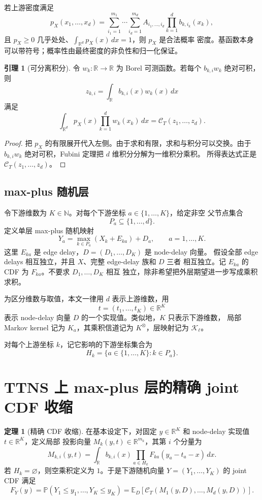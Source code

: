 \documentclass[a4paper,11pt]{article}
\theoremstyle{definition}
\newtheorem{theorem}{定理}
\newtheorem{lemma}{引理}
\newcommand{\R}{\mathbb R}
\newcommand{\N}{\mathbb N}
\newcommand{\E}{\mathbb E}
\newcommand{\Prob}{\mathbb P}
\newcommand{\1}{\mathbf 1}
\newcommand{\Kprod}{K^{\otimes}}
\begin{document}
若上游密度满足
\[
p_X(x_1,\ldots,x_d)
=
\sum_{i_1=1}^{m_1}\cdots\sum_{i_d=1}^{m_d}
A_{i_1,\ldots,i_d}
\prod_{k=1}^{d}b_{k,i_k}(x_k),
\]
且 $p_X\ge 0$ 几乎处处、$\int_{\R^d}p_X(x)\,dx=1$，则 $p_X$ 是合法概率
密度。基函数本身可以带符号；概率性由最终密度的非负性和归一化保证。

\begin{lemma}[可分离积分]
令 $w_k:\R\to\R$ 为 Borel 可测函数。若每个 $b_{k,i}w_k$ 绝对可积，则
\[
z_{k,i}=\int_\R b_{k,i}(x)w_k(x)\,dx
\]
满足
\[
\int_{\R^d}p_X(x)\prod_{k=1}^{d}w_k(x_k)\,dx
=
\mathcal C_T(z_1,\ldots,z_d).
\]
\end{lemma}

\begin{proof}
把 $p_X$ 的有限展开代入左侧。由于求和有限，求和与积分可以交换。由于
$b_{k,i}w_k$ 绝对可积，Fubini 定理把 $d$ 维积分分解为一维积分乘积。
所得表达式正是 $\mathcal C_T(z_1,\ldots,z_d)$。
\end{proof}

\subsection{max-plus 随机层}

令下游维数为 $K\in\N$。对每个下游坐标 $a\in\{1,\ldots,K\}$，给定非空
父节点集合
\[
P_a\subseteq\{1,\ldots,d\}.
\]
定义单层 max-plus 随机映射
\begin{equation}
\label{eq:maxplus}
Y_a=\max_{k\in P_a}(X_k+E_{ka})+D_a,
\qquad a=1,\ldots,K.
\end{equation}
这里 $E_{ka}$ 是 edge delay，$D=(D_1,\ldots,D_K)$ 是 node-delay 向量。
假设全部 edge delays 相互独立，并且 $X$、完整 edge-delay 族和 $D$ 三者
相互独立。记 $E_{ka}$ 的 CDF 为 $F_{ka}$。不要求 $D_1,\ldots,D_K$ 相互
独立，除非希望把外层期望进一步写成乘积求积。

为区分维数与取值，本文一律用 $d$ 表示上游维数，用
\[
t=(t_1,\ldots,t_K)\in\R^K
\]
表示 node-delay 向量 $D$ 的一个实现值。类似地，$K$ 只表示下游维数，
局部 Markov kernel 记为 $K_a$，其乘积信道记为 $\Kprod$，层映射记为
$\mathcal K_\ell$。

对每个上游坐标 $k$，记它影响的下游坐标集合为
\[
H_k=\{a\in\{1,\ldots,K\}:k\in P_a\}.
\]

\section{TTNS 上 max-plus 层的精确 joint CDF 收缩}
\label{sec:exact}

\begin{theorem}[精确 CDF 收缩]
\label{thm:exact}
在基本设定下，对固定 $y\in\R^K$ 和 node-delay 实现值 $t\in\R^K$，定义局部
投影向量 $M_k(y,t)\in\R^{m_k}$，其第 $i$ 个分量为
\[
M_{k,i}(y,t)
=
\int_\R b_{k,i}(x)
\prod_{a\in H_k}
F_{ka}(y_a-t_a-x)\,dx.
\]
若 $H_k=\varnothing$，则空乘积定义为 $1$。于是下游随机向量
$Y=(Y_1,\ldots,Y_K)$ 的 joint CDF 满足
\[
F_Y(y)
=
\Prob(Y_1\le y_1,\ldots,Y_K\le y_K)
=
\E_D\left[
\mathcal C_T(M_1(y,D),\ldots,M_d(y,D))
\right].
\]
\end{theorem}
\end{document}
